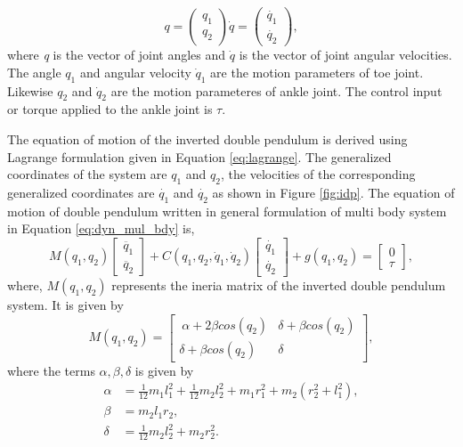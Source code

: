 \begin{equation}
	 q = 
	\begin{pmatrix}
		q_{1}\\
		q_{2}
	\end{pmatrix}
	 \dot{q} = 
	\begin{pmatrix}
		\dot{q_{1}}\\
		\dot{q_{2}}
	\end{pmatrix},
\end{equation}
where \emph{q} is the vector of joint angles and $\dot{q}$ is the vector of joint angular velocities. The angle $q_1$ and angular velocity $\dot{q}_1$ are the motion parameters of toe joint. Likewise $q_2$ and $\dot{q}_2$ are the motion parameteres of ankle joint. The control input or torque applied to the ankle joint is $\tau$. 

The equation of motion of the inverted double pendulum is derived using Lagrange formulation given in Equation \ref{eq:lagrange}. The generalized coordinates of the system are $q_1$ and $q_2$, the velocities of the corresponding generalized coordinates are $\dot{q_1}$ and $\dot{q_2}$ as shown in Figure \ref{fig:idp}. The equation of motion of double pendulum written in general formulation of multi body system in Equation \ref{eq:dyn_mul_bdy} is, 
\begin{equation}
   \label{eq:dyn_idp}
	M(q_1,q_2)
	\begin{bmatrix}
		\ddot{q_{1}} \\
		\ddot{q_{2}} 
	\end{bmatrix}
	+ C(q_1,q_2,\dot{q}_1,\dot{q}_2)
    \begin{bmatrix}
		\dot{q_{1}} \\
		\dot{q_{2}} 
	\end{bmatrix}
	+ g(q_1,q_2) = 
    \begin{bmatrix} 0 \\ \tau \end{bmatrix},
\end{equation}
where, $M(q_1,q_2)$ represents the ineria matrix of the inverted double pendulum system. It is given by 
$$ M(q_1,q_2) = \begin{bmatrix}\
    \alpha+2\beta cos(q_2) & \delta + \beta cos(q_2) \\ 
    \delta + \beta cos(q_2) & \delta  \end{bmatrix},$$ where the terms $\alpha, \beta, \delta$ is given by
    $$
    \begin{aligned}
    \alpha &= \frac{1}{12} m_1 l_1^2 + \frac{1}{12} m_2 l_2^2 + m_1 r_1^2 + m_2 (r_2^2 + l_1^2),\\
    \beta &= m_2 l_1 r_2, \\
    \delta &= \frac{1}{12} m_2 l_2^2 + m_2 r_2^2.
    \end{aligned}
    $$
